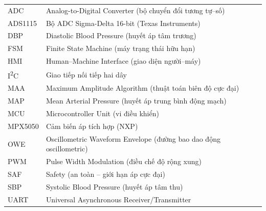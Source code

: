 \begin{table}[h!]
	\centering
	\begin{tabular}{ll}
		ADC     & Analog-to-Digital Converter (bộ chuyển đổi tương tự--số) \\
		ADS1115 & Bộ ADC Sigma-Delta 16-bit (Texas Instruments) \\
		DBP     & Diastolic Blood Pressure (huyết áp tâm trương) \\
		FSM     & Finite State Machine (máy trạng thái hữu hạn) \\
		HMI     & Human--Machine Interface (giao diện người--máy) \\
		I\textsuperscript{2}C & Giao tiếp nối tiếp hai dây \\
		MAA     & Maximum Amplitude Algorithm (thuật toán biên độ cực đại) \\
		MAP     & Mean Arterial Pressure (huyết áp trung bình động mạch) \\
		MCU     & Microcontroller Unit (vi điều khiển) \\
		MPX5050 & Cảm biến áp tích hợp (NXP) \\
		OWE     & Oscillometric Waveform Envelope (đường bao dao động oscillometric) \\
		PWM     & Pulse Width Modulation (điều chế độ rộng xung) \\
		SAF     & Safety (an toàn -- giới hạn áp cực đại) \\
		SBP     & Systolic Blood Pressure (huyết áp tâm thu) \\
		UART    & Universal Asynchronous Receiver/Transmitter \\
	\end{tabular}
\end{table}
